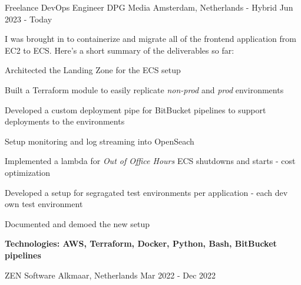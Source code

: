 


\begin{cventries}

\cventry
{Freelance DevOps Engineer} %
{DPG Media} %
{Amsterdam, Netherlands - Hybrid} %
{Jun 2023 - Today} %
{ %
I was brought in to containerize and migrate all of the frontend application from EC2 to ECS.
Here's a short summary of the deliverables so far:
\newline \hfill
	\begin{cvitems}
		\item {Architected the Landing Zone for the ECS setup}
		\item {Built a Terraform module to easily replicate \emph{non-prod} and \emph{prod} environments}
		\item {Developed a custom deployment pipe for BitBucket pipelines to support deployments to the environments}
		\item {Setup monitoring and log streaming into OpenSeach}
		\item {Implemented a lambda for \emph{Out of Office Hours} ECS shutdowns and starts - cost optimization}
		\item {Developed a setup for segragated test environments per application - each dev own test environment}
		\item {Documented and demoed the new setup}
		\item {\bfseries{Technologies:} AWS, Terraform, Docker, Python, Bash, BitBucket pipelines}
	\end{cvitems}
}

		{ZEN Software}
{Alkmaar, Netherlands}
{Mar 2022 - Dec 2022}
		{}


\end{cventries}
